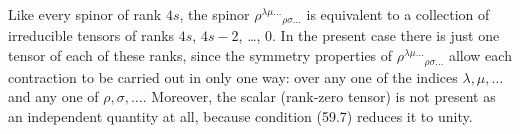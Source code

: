 Like every spinor of rank $4s$, the spinor $\rho^{\lambda\mu\ldots}{}_{\rho\sigma\ldots}$ is equivalent to a collection of irreducible tensors of ranks $4s$, $4s-2$, \ldots, 0. In the present case there is just one tensor of each of these ranks, since the symmetry properties of $\rho^{\lambda\mu\ldots}{}_{\rho\sigma\ldots}$ allow each contraction to be carried out in only one way: over any one of the indices $\lambda,\mu,\ldots$ and any one of $\rho,\sigma,\ldots$. Moreover, the scalar (rank-zero tensor) is not present as an independent quantity at all, because condition (59.7) reduces it to unity.
